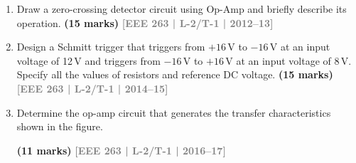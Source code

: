 \documentclass[12pt,a4paper]{article}
\newcommand{\yr}[1]{\hfill\textcolor{gray}{\small\textbf{[#1]}}}
\newcommand{\mk}[1]{\textcolor{orange!70!black}{\small\textbf{(#1 marks)}}}
\begin{document}
\begin{enumerate}

\item Draw a zero-crossing detector circuit using Op-Amp and briefly describe its operation.
\mk{15} \yr{EEE 263 | L-2/T-1 | 2012--13}

\item Design a Schmitt trigger that triggers from $+16\,\text{V}$ to $-16\,\text{V}$ at an input voltage of 12\,V and triggers from $-16\,\text{V}$ to $+16\,\text{V}$ at an input voltage of 8\,V. Specify all the values of resistors and reference DC voltage.
\mk{15} \yr{EEE 263 | L-2/T-1 | 2014--15}

\item Determine the op-amp circuit that generates the transfer characteristics shown in the figure.
\begin{center}
  
\end{center}
\mk{11} \yr{EEE 263 | L-2/T-1 | 2016--17}

\end{enumerate}
\end{document}
